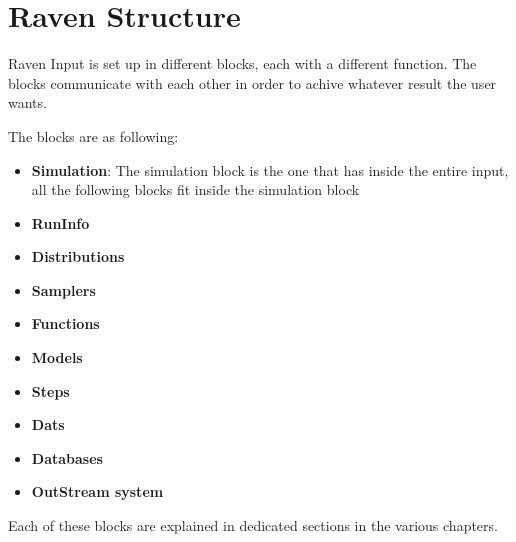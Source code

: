 \section{Raven Structure  \\ \vspace{2 mm} {\small }}

Raven Input is set up in different blocks, each with a different function. The blocks communicate with each other in order to achive whatever result the user wants.

The blocks are as following:
\begin{itemize}
\item \textbf{Simulation}: The simulation block is the one that has inside the entire input, all the following blocks fit inside the simulation block
\item \textbf{RunInfo}
\item \textbf{Distributions}
\item \textbf{Samplers}
\item \textbf{Functions}
\item \textbf{Models}
\item \textbf{Steps}
\item \textbf{Dats}
\item \textbf{Databases}
\item \textbf{OutStream system}
\end{itemize} 

Each of these blocks are explained in dedicated sections in the various chapters. 


